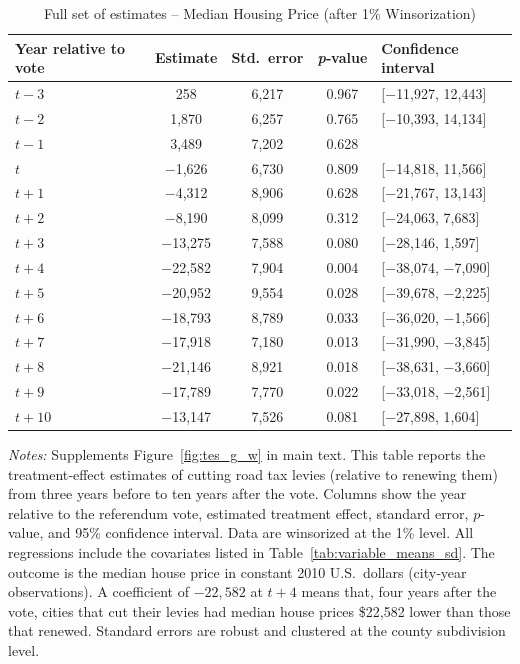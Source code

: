 \begin{table}[htbp]
    \centering
    \caption{Full set of estimates – Median Housing Price (after 1\% Winsorization)}
    \label{tab:median_sale_amount_winsorized}
    \begin{threeparttable}
    \begin{minipage}{\linewidth}
    \centering
    \begin{tabular}{p{3cm}cccl}
        \hline
        \textbf{Year relative to vote} & \textbf{Estimate} & \textbf{Std.~error} & \textbf{\textit{p}‐value} & \textbf{Confidence interval} \\
        \hline
        $t - 3$  & 258    & 6,217  & 0.967 & [$-$11,927, 12,443] \\
        $t - 2$  & 1,870  & 6,257  & 0.765 & [$-$10,393, 14,134] \\
        $t - 1$  & 3,489  & 7,202  & 0.628 & \\
        $t$      & $-$1,626 & 6,730  & 0.809 & [$-$14,818, 11,566] \\
        $t + 1$  & $-$4,312 & 8,906  & 0.628 & [$-$21,767, 13,143] \\
        $t + 2$  & $-$8,190 & 8,099  & 0.312 & [$-$24,063, 7,683] \\
        $t + 3$  & $-$13,275 & 7,588  & 0.080 & [$-$28,146, 1,597] \\
        $t + 4$  & $-$22,582 & 7,904  & 0.004 & [$-$38,074, $-$7,090] \\
        $t + 5$  & $-$20,952 & 9,554  & 0.028 & [$-$39,678, $-$2,225] \\
        $t + 6$  & $-$18,793 & 8,789  & 0.033 & [$-$36,020, $-$1,566] \\
        $t + 7$  & $-$17,918 & 7,180  & 0.013 & [$-$31,990, $-$3,845] \\
        $t + 8$  & $-$21,146 & 8,921  & 0.018 & [$-$38,631, $-$3,660] \\
        $t + 9$  & $-$17,789 & 7,770  & 0.022 & [$-$33,018, $-$2,561] \\
        $t + 10$ & $-$13,147 & 7,526  & 0.081 & [$-$27,898, 1,604] \\
        \hline
    \end{tabular}
    \vspace{0.5em}
    \begin{tablenotes}[flushleft]
        \small
        \item \textit{Notes:} Supplements Figure~\ref{fig:tes_g_w} in main text. This table reports the treatment‐effect estimates of cutting road tax levies (relative to renewing them) from three years before to ten years after the vote. Columns show the year relative to the referendum vote, estimated treatment effect, standard error, \(p\)-value, and 95\% confidence interval. Data are winsorized at the 1\% level. All regressions include the covariates listed in Table~\ref{tab:variable_means_sd}. The outcome is the median house price in constant 2010 U.S.~dollars (city‐year observations). A coefficient of $-22{,}582$ at $t+4$ means that, four years after the vote, cities that cut their levies had median house prices \$22,582 lower than those that renewed. Standard errors are robust and clustered at the county subdivision level.

\end{tablenotes}
\end{minipage}
\end{threeparttable}
\end{table}
